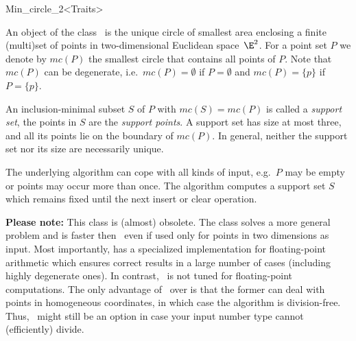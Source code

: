 
\begin{ccRefClass}{Min_circle_2<Traits>}


\ccSaveThreeColumns
\cgalMinCircleLayout

\ccDefinition

An object of the class \ccRefName\ is the unique circle of smallest area
enclosing a finite (multi)set of points in two-dimensional Euclidean
space~$\E^2$.  For a point set $P$ we denote by $mc(P)$ the smallest circle
that contains all points of $P$. Note that $mc(P)$ can be
degenerate,
i.e.~$mc(P)=\emptyset$ if
$P=\emptyset$ and $mc(P)=\{p\}$ if
$P=\{p\}$.

An inclusion-minimal subset $S$ of $P$ with $mc(S)=mc(P)$ is called a
\emph{support set},
the points in $S$ are the \emph{support points}.  A support set has size at
most three, and all its points lie on the boundary of $mc(P)$. In general,
neither the support set nor its size are necessarily unique.

The underlying algorithm can cope with all kinds of input, e.g.~$P$ may be
empty or points may occur more than once. The algorithm computes a support
set $S$ which remains fixed until the next insert or clear operation.

{\bf Please note:} This class is (almost) obsolete. The class
 solves a more general problem
and is faster then \ccRefName\, even if used only for points in two
dimensions as input. Most importantly, 
 has
a specialized implementation for floating-point arithmetic which
ensures correct results in a large number of cases (including
highly degenerate ones). In contrast, \ccRefName\ is not tuned for
floating-point computations. The only advantage of 
\ccRefName\ over  is that the
former can deal with points in homogeneous coordinates, in which 
case the algorithm is division-free. Thus, \ccRefName\ might still
be an option in case your input number type cannot (efficiently) 
divide.


\end{ccRefClass}
